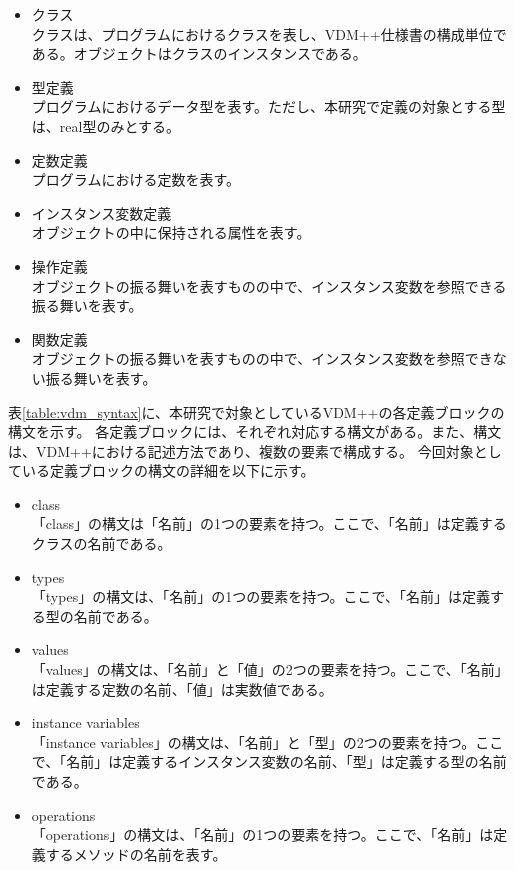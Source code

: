 \begin{itemize}
    \item クラス\\クラスは、プログラムにおけるクラスを表し、VDM++仕様書の構成単位である。オブジェクトはクラスのインスタンスである。
    \item 型定義\\プログラムにおけるデータ型を表す。ただし、本研究で定義の対象とする型は、real型のみとする。
    \item 定数定義\\プログラムにおける定数を表す。
    \item インスタンス変数定義\\オブジェクトの中に保持される属性を表す。
    \item 操作定義\\オブジェクトの振る舞いを表すものの中で、インスタンス変数を参照できる振る舞いを表す。
    \item 関数定義\\オブジェクトの振る舞いを表すものの中で、インスタンス変数を参照できない振る舞いを表す。
\end{itemize}

表\ref{table:vdm_syntax}に、本研究で対象としているVDM++の各定義ブロックの構文を示す。
各定義ブロックには、それぞれ対応する構文がある。また、構文は、VDM++における記述方法であり、複数の要素で構成する。
今回対象としている定義ブロックの構文の詳細を以下に示す。

\begin{itemize}
    \item class\\「class」の構文は「名前」の1つの要素を持つ。ここで、「名前」は定義するクラスの名前である。
    \item types\\「types」の構文は、「名前」の1つの要素を持つ。ここで、「名前」は定義する型の名前である。
    \item values\\「values」の構文は、「名前」と「値」の2つの要素を持つ。ここで、「名前」は定義する定数の名前、「値」は実数値である。
    \item instance variables\\「instance variables」の構文は、「名前」と「型」の2つの要素を持つ。ここで、「名前」は定義するインスタンス変数の名前、「型」は定義する型の名前である。
    \item operations\\「operations」の構文は、「名前」の1つの要素を持つ。ここで、「名前」は定義するメソッドの名前を表す。
\end{itemize}

